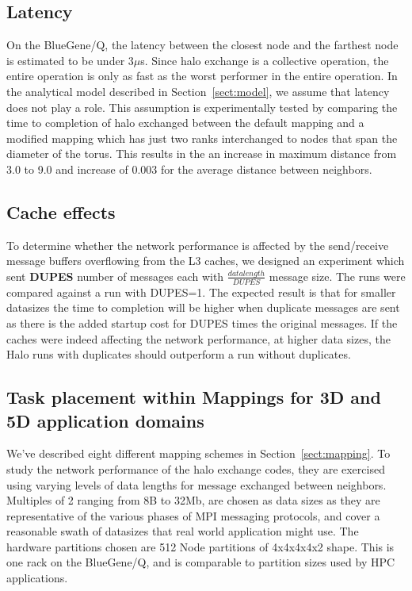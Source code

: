\documentclass{acm_proc_article-sp}
\begin{document}
\subsection{Latency}
On the BlueGene/Q, the latency between the closest node and the farthest node is estimated to be under 3$\mu$s\cite{BGQ_Interconnect_2012}.
Since halo exchange is a collective operation, the entire operation is only as fast as the worst performer in the entire operation.
In the analytical model described in Section~\ref{sect:model}, we assume that latency does not play a role.
This assumption is experimentally tested by comparing the time to completion of halo exchanged between the default mapping and a modified
mapping which has just two ranks interchanged to nodes that span the diameter of the torus. This results in the an increase in maximum distance
from 3.0 to 9.0 and increase of 0.003 for the average distance between neighbors.

\subsection{Cache effects}
To determine whether the network performance is affected by the send/receive message buffers overflowing from the
L3 caches, we designed an experiment which sent \textbf{DUPES} number of messages each with $\frac{datalength}{DUPES}$
message size. The runs were compared against a run with DUPES=1. The expected result is that for smaller datasizes
the time to completion will be higher when duplicate messages are sent as there is the added startup cost for DUPES times the original messages.
If the caches were indeed affecting the network performance, at higher data sizes, the Halo runs with duplicates should outperform
a run without duplicates.

\subsection{Task placement within Mappings for 3D and 5D application domains}
We've described eight different mapping schemes in Section~\ref{sect:mapping}.
To study the network performance of the halo exchange codes, they are exercised using varying levels of data lengths for message exchanged between neighbors.
Multiples of 2 ranging from 8B to 32Mb,  are chosen as data sizes as they are representative of the various phases of MPI messaging protocols, and cover
a reasonable swath of datasizes that real world application might use. The hardware partitions chosen are 512 Node partitions of 4x4x4x4x2 shape. This
is one rack on the BlueGene/Q, and is comparable to partition sizes used by HPC applications.
\end{document}
